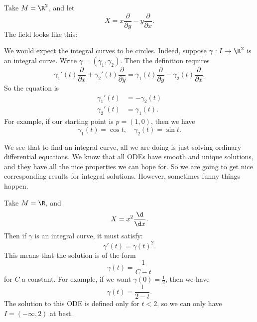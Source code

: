 \documentclass[a4paper]{article}
\begin{document}
\begin{eg}
  Take $M = \R^2$, and let
  \[
    X = x \frac{\partial}{\partial y} - y \frac{\partial}{\partial x}.
  \]
  The field looks like this:
  \begin{center}
  \end{center}
  We would expect the integral curves to be circles. Indeed, suppose $\gamma: I \to \R^2$ is an integral curve. Write $\gamma = (\gamma_1, \gamma_2)$. Then the definition requires
  \[
    \gamma_1'(t) \frac{\partial}{\partial x} + \gamma_2'(t) \frac{\partial}{\partial y} = \gamma_1(t) \frac{\partial}{\partial y} - \gamma_2(t) \frac{\partial}{\partial x}.
  \]
  So the equation is
  \begin{align*}
    \gamma_1'(t) &= - \gamma_2(t)\\
    \gamma_2'(t) &= \gamma_1(t).
  \end{align*}
  For example, if our starting point is $p = (1, 0)$, then we have
  \[
    \gamma_1(t) = \cos t,\quad \gamma_2(t) = \sin t.
  \]
\end{eg}
We see that to find an integral curve, all we are doing is just solving ordinary differential equations. We know that all ODEs have smooth and unique solutions, and they have all the nice properties we can hope for. So we are going to get nice corresponding results for integral solutions. However, sometimes funny things happen.

\begin{eg}
  Take $M = \R$, and
  \[
    X = x^2 \frac{\d}{\d x}.
  \]
  Then if $\gamma$ is an integral curve, it must satisfy:
  \[
    \gamma'(t) = \gamma(t)^2.
  \]
  This means that the solution is of the form
  \[
    \gamma(t) = \frac{1}{C - t}
  \]
  for $C$ a constant. For example, if we want $\gamma(0) = \frac{1}{2}$, then we have
  \[
    \gamma(t) = \frac{1}{2 - t}.
  \]
  The solution to this ODE is defined only for $t < 2$, so we can only have $I = (-\infty, 2)$ at best.
\end{eg}
\end{document}
